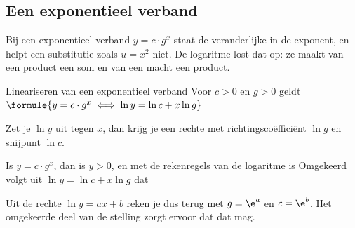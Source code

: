\subsection{Een exponentieel verband}

Bij een exponentieel verband $y = c \cdot g^x$ staat de veranderlijke in de exponent, en helpt een substitutie zoals $u = x^2$ niet. De logaritme lost dat op: ze maakt van een product een som en van een macht een product.

\begin{theorie}
\begin{stelling}{Lineariseren van een exponentieel verband}
Voor $c > 0$ en $g > 0$ geldt \qquad $\formule{y = c \cdot g^x \iff \ln y = \ln c + x \ln g}$

\vspace{1mm}
Zet je $\ln y$ uit tegen $x$, dan krijg je een rechte met richtingscoëfficiënt $\ln g$ en snijpunt $\ln c$.
\end{stelling}

\begin{bewijs}
Is $y = c \cdot g^x$, dan is $y > 0$, en met de rekenregels van de logaritme is
Omgekeerd volgt uit $\ln y = \ln c + x \ln g$ dat
\end{bewijs}
\end{theorie}

Uit de rechte $\ln y = ax + b$ reken je dus terug met $g = \e^a$ en $c = \e^b$. Het omgekeerde deel van de stelling zorgt ervoor dat dat mag.

